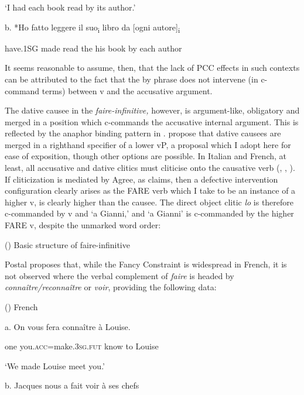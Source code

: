 \documentclass[output=paper,modfonts,nonflat]{langsci/langscibook}
\begin{document}
  ‘I had each book read by its author.’

b.   *Ho   fatto   leggere   il  suo\textsubscript{i} libro   da   [ogni  autore]\textsubscript{i}

  have.1SG   made   read   the  his   book   by   each   author

It seems reasonable to assume, then, that the lack of PCC effects in such contexts can be attributed to the fact that the by phrase does not intervene (in c-command terms) between v and the accusative argument. 

The dative causee in the \textit{faire-infinitive,} however, is argument-like, obligatory and merged in a position which c-commands the accusative internal argument. This is reflected by the anaphor binding pattern in . \citet{FolliHarley2007} propose that dative causees are merged in a righthand specifier of a lower vP, a proposal which I adopt here for ease of exposition, though other options are possible. In Italian and French, at least, all accusative and dative clitics must cliticise onto the causative verb (\citealt{Kayne1975}, \citealt{Burzio1986}, \citealt{Guasti1993}). If cliticization is mediated by Agree, as \citet{Preminger2019} claims, then a defective intervention configuration clearly arises as the FARE verb which I take to be an instance of a higher v, is clearly higher than the causee. The direct object clitic \textit{lo} is therefore c-commanded by v and ‘a Gianni,’ and ‘a Gianni’ is c-commanded by the higher FARE v, despite the unmarked word order:

()  Basic structure of faire-infinitive

 

Postal proposes that, while the Fancy Constraint is widespread in French, it is not observed where the verbal complement of \textit{faire} is headed by \textit{connaître/reconnaître} or \textit{voir}, providing the following data:

()  French \citep[4]{Postal1989}

  a.   On   vous      fera         connaître   à Louise.

  one   you.\textsc{acc}=make.\textsc{3sg.fut}   know     to Louise

  ‘We made Louise meet you.’

b.   Jacques nous     a     fait   voir   à ses chefs
\end{document}
